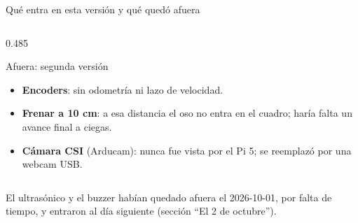 \begin{frame}{Qué entra en esta versión y qué quedó afuera}
\begin{columns}[T,onlytextwidth]
\begin{column}{0.485\textwidth}
\begin{alertblock}{Afuera: segunda versión}
\begin{itemize}
                , y una pared muy de costado no
                la ve.
          \item \textbf{Encoders}: sin odometría ni lazo de velocidad.
          \item \textbf{Frenar a 10 cm}: a esa distancia el oso no entra en el
                cuadro; haría falta un avance final a ciegas.
          \item \textbf{Cámara CSI} (Arducam): nunca fue vista por el Pi 5; se
                reemplazó por una webcam USB.
        \end{itemize}
      \end{alertblock}
    \end{column}
  \end{columns}

  \vspace{0.5em}
  {\footnotesize El ultrasónico y el buzzer habían quedado afuera el
  2026-10-01, por falta de tiempo, y entraron al día siguiente (sección ``El 2
  de octubre'').}
\end{frame}

